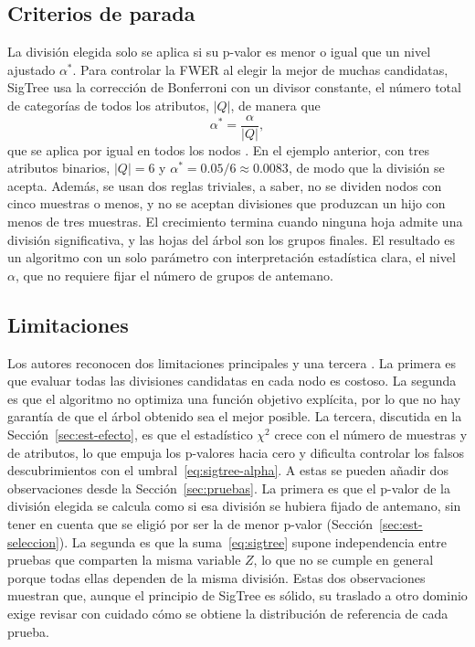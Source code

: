\subsection{Criterios de parada}

La división elegida solo se aplica si su p-valor es menor o igual que un nivel
ajustado $\alpha^\ast$. Para controlar la FWER al elegir la mejor de muchas
candidatas, SigTree usa la corrección de Bonferroni con un divisor constante,
el número total de categorías de todos los atributos, $|Q|$, de manera que
\begin{equation}\label{eq:sigtree-alpha}
  \alpha^\ast = \frac{\alpha}{|Q|} ,
\end{equation}
que se aplica por igual en todos los nodos \citep[Sec.~3.4]{Hu2025}. En el ejemplo anterior, con tres atributos binarios, $|Q| = 6$ y $\alpha^\ast = 0.05/6 \approx 0.0083$, de modo que la división se acepta. Además, se
usan dos reglas triviales, a saber, no se dividen nodos con cinco muestras o menos, y no se
aceptan divisiones que produzcan un hijo con menos de tres muestras. El
crecimiento termina cuando ninguna hoja admite una división significativa, y las
hojas del árbol son los grupos finales. El resultado es un algoritmo con un solo
parámetro con interpretación estadística clara, el nivel $\alpha$, que no
requiere fijar el número de grupos de antemano.

\subsection{Limitaciones}

Los autores reconocen dos limitaciones principales y una tercera \citep[Sec.~5]{Hu2025}. La primera es que evaluar todas las
divisiones candidatas en cada nodo es costoso. La segunda es que el algoritmo no optimiza una
función objetivo explícita, por lo que no hay garantía de que el árbol obtenido
sea el mejor posible. La tercera, discutida en la Sección~\ref{sec:est-efecto}, es que el
estadístico $\chi^2$ crece con el número de muestras y de atributos, lo que empuja
los p-valores hacia cero y dificulta controlar los falsos descubrimientos con el
umbral~\eqref{eq:sigtree-alpha}. A estas se pueden añadir dos observaciones desde
la Sección~\ref{sec:pruebas}. La primera es que el p-valor de la división elegida
se calcula como si esa división se hubiera fijado de antemano, sin tener en cuenta
que se eligió por ser la de menor p-valor (Sección~\ref{sec:est-seleccion}). La
segunda es que la suma~\eqref{eq:sigtree} supone independencia entre pruebas que
comparten la misma variable $Z$, lo que no se cumple en general porque todas ellas
dependen de la misma división. Estas dos observaciones muestran que, aunque el
principio de SigTree es sólido, su traslado a otro dominio exige revisar con
cuidado cómo se obtiene la distribución de referencia de cada prueba.

